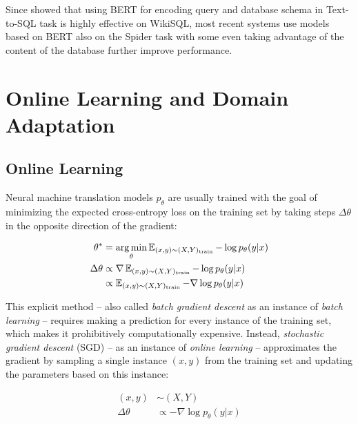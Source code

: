 Since \textcite{hwang-2019} showed that using BERT \parencite{devlin-2019} for
encoding query and database schema in Text-to-SQL task is highly effective on
WikiSQL, most recent systems use models based on BERT also on the Spider task
\parencites{shaw-2020}{wang-2020}{lin-2020} with some even taking advantage of
the content of the database \parencites{wang-2020}{lin-2020} further improve
performance.

\section{Online Learning and Domain Adaptation}

\subsection{Online Learning}

Neural machine translation models \(p_{\theta}\) are usually trained with the
goal of minimizing the expected cross-entropy loss on the training set
\parencite[376]{stahlberg-2020} by taking steps \(\Delta \theta\) in the opposite
direction of the gradient:

\begin{align}
  \theta^* &= \operatorname*{arg\,min}_{\theta} \operatorname{\mathbb{E}}_{(x, y) \sim (X, Y)_{\text{train}}} -\log p_{\theta}(y|x)\\
  \Delta \theta &\propto \nabla \operatorname{\mathbb{E}}_{(x, y) \sim (X, Y)_{\text{train}}} -\log p_{\theta}(y|x)\\
  &\propto \operatorname{\mathbb{E}}_{(x, y) \sim (X, Y)_{\text{train}}} -\nabla \log p_{\theta}(y|x)
\end{align}

This explicit method – also called \emph{batch gradient descent} as an instance
of \emph{batch learning} \parencites[275]{goodfellow-2016}[100]{murphy-2021} –
requires making a prediction for every instance of the training set, which makes
it prohibitively computationally expensive. Instead, \emph{stochastic gradient
  descent} (SGD) – as an instance of \emph{online learning}
\parencites[275]{goodfellow-2016}[100]{murphy-2021} – approximates the gradient
by sampling a single instance \((x,y)\) from the training set and updating the
parameters based on this instance:

\begin{align}
  (x,y) &\sim (X,Y)\\
  \Delta \theta &\propto -\nabla \log p_{\theta}(y|x)\\
\end{align}

